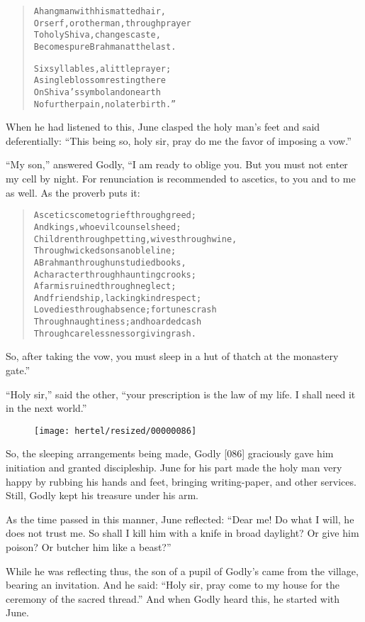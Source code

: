 \documentclass[article, twoside, 10pt]{memoir}
\renewenvironment{verbatim}{%
\begin{quote}%
\vskip -10pt%
\begin{alltt}\normalfont\small}{\end{alltt}%
\end{quote}%
\vskip -10pt
} %
\begin{document}
\begin{verbatim}
A hangman with his matted hair,
Or serf, or other man, through prayer
To holy Shiva, changes caste,
Becomes pure Brahman at the last.

Six syllables, a little prayer;
A single blossom resting there
On Shiva's symbol{\textemdash}and on earth
No further pain, no later birth.”
\end{verbatim}
When he had listened to this, June clasped the holy man's feet and
said deferentially:
``This being so, holy sir, pray do me the favor of imposing a vow.''

``My son,'' answered Godly, “I am ready to oblige you. But you must
not enter my cell by night. For renunciation is recommended to
ascetics, to you and to me as well. As the proverb puts it:

\begin{verbatim}
Ascetics come to grief through greed;
And kings, who evil counsels heed;
Children through petting, wives through wine,
Through wicked sons a noble line;
A Brahman through unstudied books,
A character through haunting crooks;
A farm is ruined through neglect;
And friendship, lacking kind respect;
Love dies through absence; fortunes crash
Through naughtiness; and hoarded cash
Through carelessness or giving rash.
\end{verbatim}
So, after taking the vow, you must sleep in a hut of thatch at the
monastery gate.”

``Holy sir,'' said the other,
``your prescription is the law of my life. I shall need it in the next world.''
\begin{figure}[p]\texttt{[image: hertel/resized/00000086]}\end{figure}So, the sleeping arrangements being made, Godly [086] graciously
gave him initiation and granted discipleship. June for his part
made the holy man very happy by rubbing his hands and feet,
bringing writing-paper, and other services. Still, Godly kept his
treasure under his arm.

As the time passed in this manner, June reflected:
``Dear me! Do what I will, he does not trust me. So shall I kill him with a knife in broad daylight? Or give him poison? Or butcher him like a beast?''

While he was reflecting thus, the son of a pupil of Godly's came
from the village, bearing an invitation. And he said:
``Holy sir, pray come to my house for the ceremony of the sacred thread.''
And when Godly heard this, he started with June.
\end{document}
